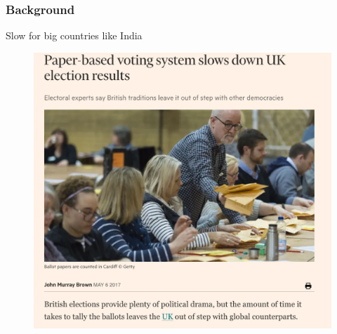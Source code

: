 \documentclass{beamer}
\begin{document}
%


\begin{frame}
\frametitle{Background}
{Slow for big countries like India}
\begin{figure}
	\begin{center}
	\includegraphics[scale=0.25]{uk-election.png}
	\end{center}
  \end{figure} 
\end{frame}
\end{document}
